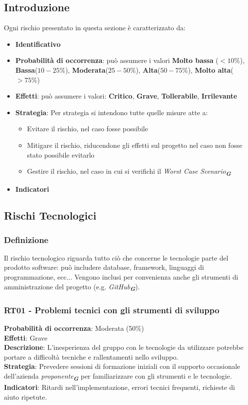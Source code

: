 \documentclass[a4paper,12pt]{article}
\newcommand{\glossario}[1]{\textit{#1}\textsubscript{\textbf{\textit{\textcolor{lightblack}{G}}}}}
\begin{document}
\subsection{Introduzione}
Ogni rischio presentato in questa sezione è caratterizzato da:
\begin{itemize}
    \item \textbf{Identificativo}
    \item \textbf{Probabilità di occorrenza}: può assumere i valori \textbf{Molto bassa} ($<10\%$), \textbf{Bassa}($10-25\%$), \textbf{Moderata}($25-50\%$), \textbf{Alta}($50-75\%$), \textbf{Molto alta}($>75\%$)
    \item \textbf{Effetti}: può assumere i valori: \textbf{Critico}, \textbf{Grave}, \textbf{Tollerabile}, \textbf{Irrilevante}
    \item \textbf{Strategia}: Per strategia si intendono tutte quelle misure atte a:
    \begin{itemize}
        \item Evitare il rischio, nel caso fosse possibile
        \item Mitigare il rischio, riducendone gli effetti sul progetto nel caso non fosse stato possibile evitarlo
        \item Gestire il rischio, nel caso in cui si verifichi il \glossario{Worst Case Scenario}
    \end{itemize}
    \item \textbf{Indicatori}
\end{itemize}



\subsection{Rischi Tecnologici}

\subsubsection{Definizione}
Il rischio tecnologico riguarda tutto ciò che concerne le tecnologie parte del prodotto software: può includere database, framework, linguaggi di programmazione, ecc... Vengono inclusi per convenienza anche gli strumenti di amministrazione del progetto (e.g. \glossario{GitHub}).

\subsubsection{RT01 - Problemi tecnici con gli strumenti di sviluppo}
\label{RT01}
\textbf{Probabilità di occorrenza}: Moderata (50\%)\\
\textbf{Effetti}: Grave\\
\textbf{Descrizione}: L'inesperienza del gruppo con le tecnologie da utilizzare potrebbe portare a difficoltà tecniche e rallentamenti nello sviluppo.\\
\textbf{Strategia}: Prevedere sessioni di formazione iniziali con il supporto occasionale dell'azienda \glossario{proponente} per familiarizzare con gli strumenti e le tecnologie.\\
\textbf{Indicatori}: Ritardi nell'implementazione, errori tecnici frequenti, richieste di aiuto ripetute.
\end{document}
